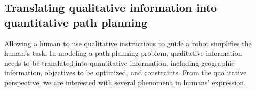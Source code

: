 \documentclass[phd]{byuprop}
\begin{document}
\subsection{Translating qualitative information into quantitative path planning}
\label{sec:intro:modeling_qualitative_information_into_quantitative_path_planning}

Allowing a human to use qualitative instructions to guide a robot simplifies the human's task.
In modeling a path-planning problem, qualitative information needs to be translated into quantitative information, including geographic information, objectives to be optimized, and constraints.
From the qualitative perspective, we are interested with several phenomena in humans' expression.
\end{document}
